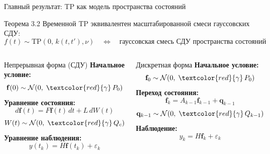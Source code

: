 \documentclass{beamer}
\begin{document}
\begin{frame}{Главный результат: TP как модель пространства состояний}
\footnotesize

\begin{block}{\footnotesize Теорема 3.2}
    Временной TP эквивалентен масштабированной смеси гауссовских СДУ:
    $$
        f(t) \sim \mathrm{TP}(0,\, k(t,t'), \nu)
        \quad\Longleftrightarrow\quad
        \text{гауссовская смесь СДУ пространства состояний}
    $$
\end{block}

\begin{columns}[T]

    \begin{block}{\footnotesize Непрерывная форма (СДУ)}
        \vspace{2pt}
        \textbf{Начальное условие:}
        $$
            \mathbf{f}(0) \sim \mathcal{N}(0,\; \textcolor{red}{\gamma}\, P_0)
        $$
        \textbf{Уравнение состояния:}
        $$
            d\mathbf{f}(t) = F\mathbf{f}(t)\,dt + L\,dW(t)
        $$
        $$
            W(t)\sim\mathcal{N}(0,\;\textcolor{red}{\gamma}\, Q_c)
        $$
        \textbf{Уравнение наблюдения:}
        $$
            y(t_k) = H\mathbf{f}(t_k) + \varepsilon_k
        $$
    \end{block}

    \begin{block}{\footnotesize Дискретная форма}
        \vspace{2pt}
        \textbf{Начальное условие:}
        $$
            \mathbf{f}_0 \sim \mathcal{N}(0,\; \textcolor{red}{\gamma}\, P_0)
        $$
        \textbf{Переход состояния:}
        $$
            \mathbf{f}_k = A_{k-1}\mathbf{f}_{k-1} + \mathbf{q}_{k-1}
        $$
        $$
            \mathbf{q}_{k-1} \sim \mathcal{N}(0,\;\textcolor{red}{\gamma}\, Q_{k-1})
        $$
        \textbf{Наблюдение:}
        $$
            y_k = H\mathbf{f}_k + \varepsilon_k
        $$
    \end{block}

\end{columns}

\end{frame}


\end{document}
